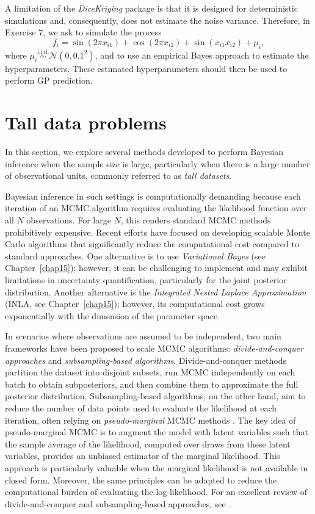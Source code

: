 A limitation of the \textit{DiceKriging} package is that it is designed for deterministic simulations and, consequently, does not estimate the noise variance. Therefore, in Exercise 7, we ask to simulate the process
\[
f_i = \sin(2\pi x_{i1}) + \cos(2\pi x_{i2}) + \sin(x_{i1} x_{i2}) + \mu_i,
\]
where \( \mu_i \overset{\text{i.i.d.}}{\sim} \mathcal{N}(0, 0.1^2) \), and to use an empirical Bayes approach to estimate the hyperparameters. These estimated hyperparameters should then be used to perform GP prediction.

\section{Tall data problems}\label{13_5}
In this section, we explore several methods developed to perform Bayesian inference when the sample size is large, particularly when there is a large number of observational units, commonly referred to as \textit{tall datasets}.

Bayesian inference in such settings is computationally demanding because each iteration of an MCMC algorithm requires evaluating the likelihood function over all \( N \) observations. For large \( N \), this renders standard MCMC methods prohibitively expensive. Recent efforts have focused on developing scalable Monte Carlo algorithms that significantly reduce the computational cost compared to standard approaches. One alternative is to use \textit{Variational Bayes} (see Chapter~\ref{chap15}); however, it can be challenging to implement and may exhibit limitations in uncertainty quantification, particularly for the joint posterior distribution. Another alternative is the \textit{Integrated Nested Laplace Approximation} (INLA, see Chapter~\ref{chap15}); however, its computational cost grows exponentially with the dimension of the parameter space. 

In scenarios where observations are assumed to be independent, two main frameworks have been proposed to scale MCMC algorithms: \textit{divide-and-conquer approaches} and \textit{subsampling-based algorithms}. Divide-and-conquer methods partition the dataset into disjoint subsets, run MCMC independently on each batch to obtain subposteriors, and then combine them to approximate the full posterior distribution. Subsampling-based algorithms, on the other hand, aim to reduce the number of data points used to evaluate the likelihood at each iteration, often relying on \textit{pseudo-marginal} MCMC methods \cite{andrieu2009pseudoefficient}. The key idea of pseudo-marginal MCMC is to augment the model with latent variables such that the sample average of the likelihood, computed over draws from these latent variables, provides an unbiased estimator of the marginal likelihood. This approach is particularly valuable when the marginal likelihood is not available in closed form. Moreover, the same principles can be adapted to reduce the computational burden of evaluating the log-likelihood. For an excellent review of divide-and-conquer and subsampling-based approaches, see \cite{bardenet2017markov}.

